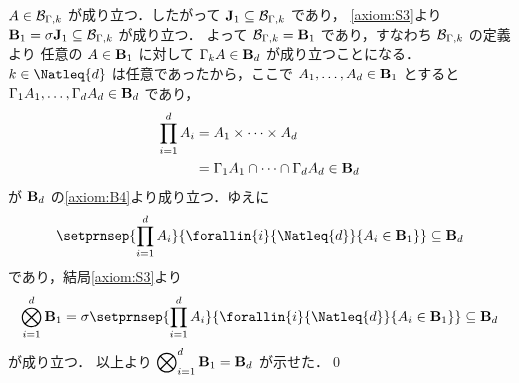 \documentclass[a4paper,dvipdfmx,leqno]{jsarticle}
\begin{document}
{      $A \in \mathcal{B}_{\Gamma, k}$ が成り立つ．したがって $\mathbf{J}_{1} \subseteq \mathcal{B}_{\Gamma, k}$ であり，
      \eqref{axiom:S3}より $\mathbf{B}_{1} = \sigma\mathbf{J}_{1} \subseteq \mathcal{B}_{\Gamma, k}$ が成り立つ．
      よって $\mathcal{B}_{\Gamma, k} = \mathbf{B}_{1}$ であり，すなわち $\mathcal{B}_{\Gamma, k}$ の定義より
      任意の $A \in \mathbf{B}_{1}$ に対して $\Gamma_{k}A \in \mathbf{B}_{d}$ が成り立つことになる．
    \decosep
      $k \in \Natleq{d}$ は任意であったから，ここで $A_{1}, \ldots, A_{d} \in \mathbf{B}_{1}$ とすると
      $\Gamma_{1}A_{1}, \ldots, \Gamma_{d}A_{d} \in \mathbf{B}_{d}$ であり，
      \begin{align*}
        \prod_{i = 1}^{d} A_{i}
          &= A_{1} \times \cdots \times A_{d}
        \\&= \Gamma_{1}A_{1} \cap \cdots \cap \Gamma_{d}A_{d} \in \mathbf{B}_{d}
      \end{align*}
      が $\mathbf{B}_{d}$ の\eqref{axiom:B4}より成り立つ．ゆえに
      \begin{align*}
        \setprnsep{\prod_{i = 1}^{d} A_{i}}{\forallin{i}{\Natleq{d}}{A_{i} \in \famBorel{1}}} \subseteq \famBorel{d}
      \end{align*}
      であり，結局\eqref{axiom:S3}より
      \begin{align*}
        \bigotimes_{i = 1}^{d} \famBorel{1}
          = \appv{\sigma}{\setprnsep{\prod_{i = 1}^{d} A_{i}}{\forallin{i}{\Natleq{d}}{A_{i} \in \famBorel{1}}}} \subseteq \famBorel{d}
      \end{align*}
      が成り立つ．
    \decosep
      以上より $\displaystyle \bigotimes\nolimits_{i = 1}^{d} \mathbf{B}_{1} = \mathbf{B}_{d}$ が示せた．\qed
    }
\end{document}
